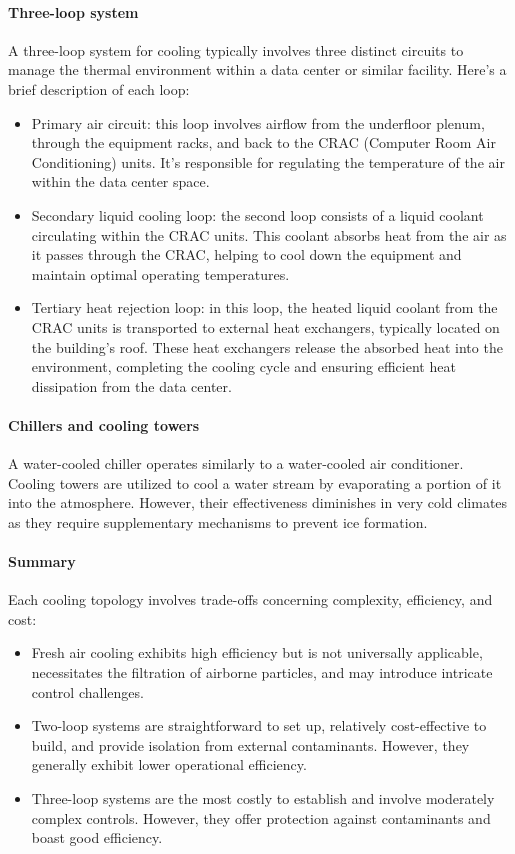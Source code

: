 \paragraph*{Three-loop system}
A three-loop system for cooling typically involves three distinct circuits to manage the thermal environment within a data center or similar facility. Here's a brief description of each loop:
\begin{itemize}
    \item Primary air circuit: this loop involves airflow from the underfloor plenum, through the equipment racks, and back to the CRAC (Computer Room Air Conditioning) units. 
        It's responsible for regulating the temperature of the air within the data center space.
    \item Secondary liquid cooling loop: the second loop consists of a liquid coolant circulating within the CRAC units. This coolant absorbs heat from the air as it passes through the CRAC, helping to cool down the equipment and maintain optimal operating temperatures.
    \item Tertiary heat rejection loop: in this loop, the heated liquid coolant from the CRAC units is transported to external heat exchangers, typically located on the building's roof. 
        These heat exchangers release the absorbed heat into the environment, completing the cooling cycle and ensuring efficient heat dissipation from the data center.
\end{itemize}

\paragraph*{Chillers and cooling towers}
A water-cooled chiller operates similarly to a water-cooled air conditioner. 
Cooling towers are utilized to cool a water stream by evaporating a portion of it into the atmosphere. 
However, their effectiveness diminishes in very cold climates as they require supplementary mechanisms to prevent ice formation.

\paragraph*{Summary}
Each cooling topology involves trade-offs concerning complexity, efficiency, and cost:
\begin{itemize}
    \item Fresh air cooling exhibits high efficiency but is not universally applicable, necessitates the filtration of airborne particles, and may introduce intricate control challenges.
    \item Two-loop systems are straightforward to set up, relatively cost-effective to build, and provide isolation from external contaminants. 
        However, they generally exhibit lower operational efficiency.
    \item Three-loop systems are the most costly to establish and involve moderately complex controls. 
        However, they offer protection against contaminants and boast good efficiency.
\end{itemize}

